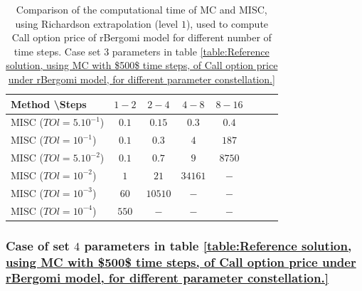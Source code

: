 \documentclass[11pt]{article}
\begin{document}
\begin{table}[h!]
\centering
\begin{tabular}{l*{6}{c}r}
Method \textbackslash  Steps            & $1-2$ & $2-4$ & $4-8$ & $8-16$ &   \\
\hline
MISC ($TOl=5.10^{-1}$)  & $0.1$ & $0.15$ & $0.3$ & $0.4$  \\
MISC ($TOl=10^{-1}$)  & $0.1$ & $0.3$ & $4$ & $187$  \\
MISC ($TOl=5.10^{-2}$)  & $0.1$ & $0.7$ & $9$ & $8750$ \\
MISC ($TOl=10^{-2}$)  & $1$ & $21$ & $34161$ & $-$  \\	
MISC ($TOl=10^{-3}$)  & $60$ & $10510$ &$-$ & $-$  \\	
MISC ($TOl=10^{-4}$)  & $550$ &$-$ & $-$ & $-$  \\	
\hline

\end{tabular}
\caption{Comparison of the computational time of  MC and MISC, using Richardson extrapolation (level $1$), used to compute Call option price of rBergomi model for different number of time steps. Case set $3$ parameters in table \ref{table:Reference solution, using MC with $500$ time steps, of Call option price under rBergomi model, for different parameter constellation.}}
\label{Comparsion of the computational time of  MC and MISC, using Richardson extrapolation (level $1$), used to compute Call option price of rBergomi model for different number of time steps. Case set $3$ parameters,linear}
\end{table}
\FloatBarrier

\subsubsection{Case of set $4$ parameters in table \ref{table:Reference solution, using MC with $500$ time steps, of Call option price under rBergomi model, for different parameter constellation.}}\label{sec:Case of set 4 parameters}
\end{document}
